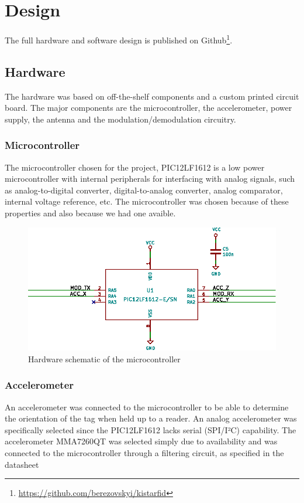 \section{Design}

The full  hardware and software design is published on Github\footnote{\url{https://github.com/berezovskyi/kistarfid}}.

\subsection{Hardware}
The hardware was based on off-the-shelf components and a custom printed circuit board.
The major components are the microcontroller, the accelerometer, power supply, the antenna and the modulation/demodulation circuitry.

\subsubsection{Microcontroller}
The microcontroller chosen for the project, PIC12LF1612 is a low power microcontroller with internal peripherals for interfacing with analog signals, such as analog-to-digital converter, digital-to-analog converter, analog comparator, internal voltage reference, etc\cite{pic}.
The microcontroller was chosen because of these properties and also because we had one avaible.

\begin{figure}[h!]
    \centering
    \includegraphics[scale=1.0]{res/schematic-pic.eps}
    \caption{Hardware schematic of the microcontroller}
    \label{fig:sch-pic}
\end{figure}

\subsubsection{Accelerometer}
An accelerometer was connected to the microcontroller to be able to determine the orientation of the tag when held up to a reader.
An analog accelerometer was specifically selected since the PIC12LF1612 lacks serial (SPI/I²C) capability.
The accelerometer MMA7260QT was selected simply due to availability and was connected to the microcontroller through a filtering circuit, as specified in the datasheet\cite{mma-acc}


